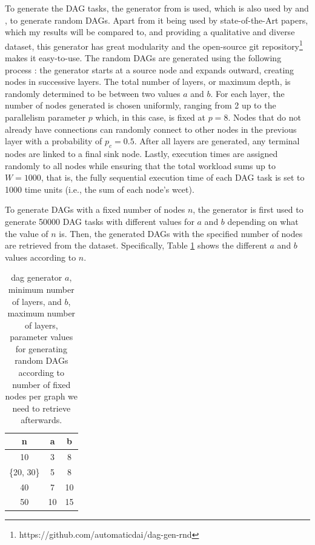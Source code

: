 To generate the DAG tasks, the generator from \citet{zhao2020DAGsched} is used, which is also used by 
\citet{Lee2021GlobalDagSchedDRL} and \citet{Zhao2022DAGsched}, to generate
random DAGs.
Apart from it being used by state-of-the-Art papers, which my results will be compared to,
and providing a qualitative and diverse dataset,
this generator has great modularity and the open-source git repository\footnote{https://github.com/automaticdai/dag-gen-rnd} 
makes it easy-to-use.
The random DAGs are generated using the following process :
the generator starts at a source node and expands outward, 
creating nodes in successive layers. The total number of layers, 
or maximum depth, is randomly determined to be between two values $a$ and $b$.
For each layer, the number of nodes generated is chosen uniformly, 
ranging from 2 up to the parallelism parameter $p$ which, in this case, 
is fixed at $p=8$. Nodes that do 
not already have connections can randomly connect to other nodes in 
the previous layer with a probability of $p_c=0.5$. After all layers 
are generated, any terminal nodes are linked to a final sink node.
Lastly, 
execution times are assigned randomly to all nodes while ensuring 
that the total workload sums up to $W = 1000$\cite{zhao2020DAGsched},
that is, the fully sequential execution time of each DAG task is set to 1000 time units (i.e., the sum of each node's wcet).

To generate DAGs with a fixed number of nodes $n$, 
the generator is first used to generate 50000 DAG tasks
with different values for $a$ and $b$ depending on what 
the value of $n$ is. Then, the generated DAGs with 
the specified number of nodes are retrieved from the dataset.
Specifically, Table \ref{tab:layer_num_minmax} 
shows the different $a$ and $b$ values according to $n$.

\begin{table}
    \centering
    \begin{tabular}{|c|c|c|}    
        \hline
        \textbf{n} & \textbf{a} & \textbf{b} \\
        \hline
        10 & 3 & 8 \\
        \hline
        \{20, 30\} & 5 & 8 \\
        \hline
        40 & 7 & 10 \\
        \hline
        50 & 10 & 15 \\
        \hline
    \end{tabular}
    \caption{dag generator $a$, minimum number of layers, and $b$, maximum
    number of layers, parameter values for generating 
    random DAGs according to number of fixed nodes per graph we need to retrieve afterwards.}
    \label{tab:layer_num_minmax}
\end{table}

